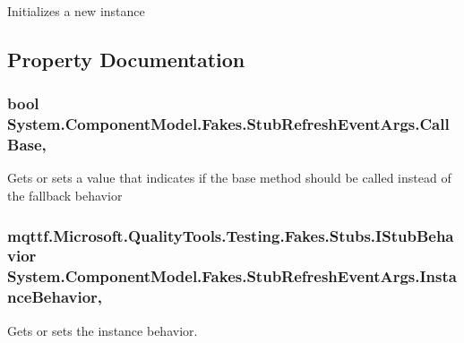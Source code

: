 Initializes a new instance



\subsection{Property Documentation}
\hypertarget{class_system_1_1_component_model_1_1_fakes_1_1_stub_refresh_event_args_ac250e0ffe65425ed736c77d36156387f}{
\subsubsection[{Call\-Base}]{\setlength{\rightskip}{0pt plus 5cm}bool System.\-Component\-Model.\-Fakes.\-Stub\-Refresh\-Event\-Args.\-Call\-Base\hspace{0.3cm}{\ttfamily [get]}, {\ttfamily [set]}}}\label{class_system_1_1_component_model_1_1_fakes_1_1_stub_refresh_event_args_ac250e0ffe65425ed736c77d36156387f}


Gets or sets a value that indicates if the base method should be called instead of the fallback behavior

\hypertarget{class_system_1_1_component_model_1_1_fakes_1_1_stub_refresh_event_args_a5089108151ec63b969c0f353d72956e3}{
\subsubsection[{Instance\-Behavior}]{\setlength{\rightskip}{0pt plus 5cm}mqttf.\-Microsoft.\-Quality\-Tools.\-Testing.\-Fakes.\-Stubs.\-I\-Stub\-Behavior System.\-Component\-Model.\-Fakes.\-Stub\-Refresh\-Event\-Args.\-Instance\-Behavior\hspace{0.3cm}{\ttfamily [get]}, {\ttfamily [set]}}}\label{class_system_1_1_component_model_1_1_fakes_1_1_stub_refresh_event_args_a5089108151ec63b969c0f353d72956e3}


Gets or sets the instance behavior.

